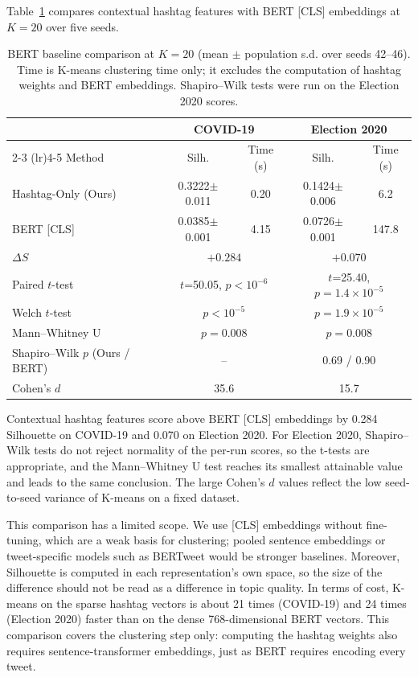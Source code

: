 \documentclass[pdflatex,sn-mathphys-num]{sn-jnl}%
\begin{document}
Table~\ref{tab:bert_comparison} compares contextual hashtag features with BERT [CLS] embeddings at $K=20$ over five seeds.

\begin{table}[t]
\centering
\caption{BERT baseline comparison at $K=20$ (mean $\pm$ population s.d. over seeds 42--46). Time is K-means clustering time only; it excludes the computation of hashtag weights and BERT embeddings. Shapiro--Wilk tests were run on the Election 2020 scores.}
\label{tab:bert_comparison}
\begin{tabular}{lcccc}
\toprule
 & \multicolumn{2}{c}{COVID-19} & \multicolumn{2}{c}{Election 2020} \\
\cmidrule(lr){2-3} \cmidrule(lr){4-5}
Method & Silh. & Time (s) & Silh. & Time (s) \\
\midrule
Hashtag-Only (Ours) & 0.3222$\pm$0.011 & 0.20 & 0.1424$\pm$0.006 & 6.2 \\
BERT [CLS]          & 0.0385$\pm$0.001 & 4.15 & 0.0726$\pm$0.001 & 147.8 \\
\midrule
$\Delta S$          & \multicolumn{2}{c}{$+0.284$} & \multicolumn{2}{c}{$+0.070$} \\
Paired $t$-test     & \multicolumn{2}{c}{$t$=50.05, $p<10^{-6}$} & \multicolumn{2}{c}{$t$=25.40, $p=1.4\times10^{-5}$} \\
Welch $t$-test      & \multicolumn{2}{c}{$p<10^{-5}$} & \multicolumn{2}{c}{$p=1.9\times10^{-5}$} \\
Mann--Whitney U     & \multicolumn{2}{c}{$p=0.008$} & \multicolumn{2}{c}{$p=0.008$} \\
Shapiro--Wilk $p$ (Ours / BERT) & \multicolumn{2}{c}{--} & \multicolumn{2}{c}{0.69 / 0.90} \\
Cohen's $d$         & \multicolumn{2}{c}{35.6} & \multicolumn{2}{c}{15.7} \\
\bottomrule
\end{tabular}
\end{table}

Contextual hashtag features score above BERT [CLS] embeddings by 0.284 Silhouette on COVID-19 and 0.070 on Election 2020. For Election 2020, Shapiro--Wilk tests do not reject normality of the per-run scores, so the t-tests are appropriate, and the Mann--Whitney U test reaches its smallest attainable value and leads to the same conclusion. The large Cohen's $d$ values reflect the low seed-to-seed variance of K-means on a fixed dataset.

This comparison has a limited scope. We use [CLS] embeddings without fine-tuning, which are a weak basis for clustering; pooled sentence embeddings or tweet-specific models such as BERTweet would be stronger baselines. Moreover, Silhouette is computed in each representation's own space, so the size of the difference should not be read as a difference in topic quality. In terms of cost, K-means on the sparse hashtag vectors is about 21 times (COVID-19) and 24 times (Election 2020) faster than on the dense 768-dimensional BERT vectors. This comparison covers the clustering step only: computing the hashtag weights also requires sentence-transformer embeddings, just as BERT requires encoding every tweet.
\end{document}
